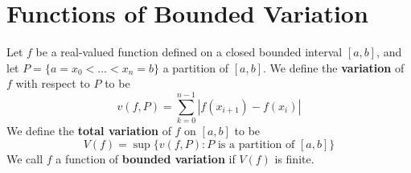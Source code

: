 \section{Functions of Bounded Variation}

\begin{definition}
    Let $f$ be a real-valued function defined on a closed bounded interval
    $[a,b]$, and let $P=\{a=x_0<\dots<x_n=b\}$ a partition of $[a,b]$. We define
    the \textbf{variation} of $f$ with respect to  $P$ to be
    \begin{equation*}
        v(f,P)=\sum_{k=0}^{n-1}{|f(x_{i+1})-f(x_i)|}
    \end{equation*}
    We define the \textbf{total variation} of $f$ on  $[a,b]$ to be
    \begin{equation*}
        V(f)=\sup{\{v(f,P) : P \text{ is a partition of } [a,b]\}}
    \end{equation*}
    We call $f$ a function of \textbf{bounded variation} if $V(f)$ is finite.
\end{definition}

